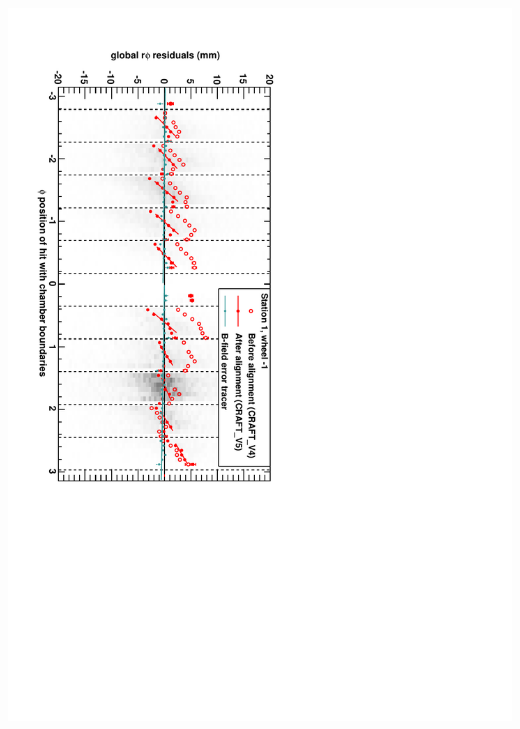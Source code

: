 \documentclass[compress]{beamer}
\begin{document}
\begin{frame}
\begin{columns}
\includegraphics[height=1.1\linewidth, angle=90]{bfieldtalk_example2.pdf}

\end{columns}
\end{frame}
\end{document}
